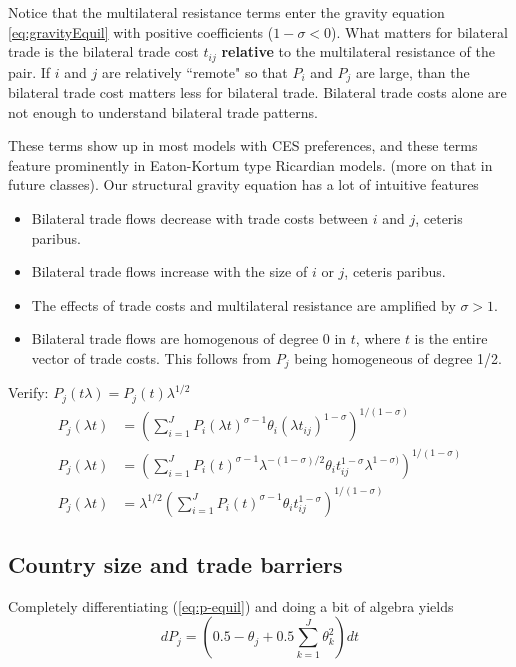\documentclass[11pt, pdftex]{article}
\newcommand{\sig}{\sigma}
\begin{document}
Notice that the multilateral resistance terms enter the gravity equation \eqref{eq:gravityEquil} with positive coefficients ($1-\sigma<0$). What matters for bilateral trade is the bilateral trade cost $t_{ij}$ \textbf{relative} to the multilateral resistance of the pair.  If $i$ and $j$ are relatively ``remote" so that $P_i$ and $P_j$ are large, than the bilateral trade cost matters less for bilateral trade.  Bilateral trade costs alone are not enough to understand bilateral trade patterns.

These terms show up in most models with CES preferences, and these terms feature prominently in Eaton-Kortum type Ricardian models. (more on that in future classes).  Our structural gravity equation has a lot of intuitive features
%
\begin{itemize}
\item Bilateral trade flows decrease with trade costs between $i$ and $j$, ceteris paribus.
\item Bilateral trade flows increase with the size of $i$ or $j$, ceteris paribus.
\item The effects of trade costs and multilateral resistance are amplified by $\sig>1$.
\item Bilateral trade flows are homogenous of degree 0 in $t$, where $t$ is the entire vector of trade costs. This follows from $P_j$ being homogeneous of degree 1/2.
\end{itemize}
%
Verify: $P_j(t\lambda)=P_j(t)\lambda^{1/2}$
\begin{align}
P_j(\lambda t)&=\left(\sum_{i=1}^J P_i(\lambda t)^{\sigma-1}\theta_i (\lambda t_{ij})^{1-\sigma}\right)^{1/(1-\sigma)}\\
P_j(\lambda t)&=\left(\sum_{i=1}^J P_i(t)^{\sigma-1}\lambda^{-(1-\sigma)/2} \theta_i t_{ij}^{1-\sigma}\lambda^{1-\sigma)}\right)^{1/(1-\sigma)}\\
P_j(\lambda t)&=\lambda^{1/2} \left(\sum_{i=1}^J P_i(t)^{\sigma-1}\theta_i t_{ij}^{1-\sigma}\right)^{1/(1-\sigma)}
\end{align}

\subsection*{Country size and trade barriers}
Completely differentiating (\ref{eq:p-equil}) and doing a bit of algebra yields
\begin{equation}
\label{dP}
dP_j=\left(0.5-\theta_j+0.5\sum_{k=1}^J\theta_k^2\right)dt
\end{equation}
\end{document}
